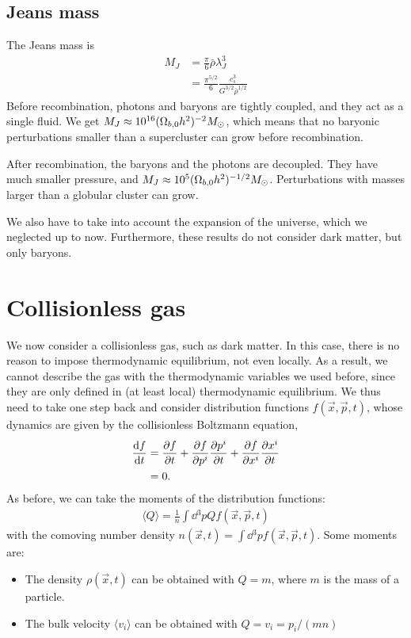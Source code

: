 
\subsection*{Jeans mass}
The Jeans mass is
\begin{align*}
	M_J
	&= \frac{\pi}{6} \bar{\rho} \lambda_J^3\\
	&= \frac{\pi^{5/2}}{6} \frac{c_s^3}{G^{3/2} \bar{\rho}^{1/2}}
\end{align*}
Before recombination, photons and baryons are tightly coupled, and they act as a single fluid. We get $M_J \approx \num{e16} (\Omega_{b,0}h^2)^{-2} M_\odot$, which means that no baryonic perturbations smaller than a supercluster can grow before recombination.

After recombination, the baryons and the photons are decoupled. They have much smaller pressure, and $M_J \approx \num{e5} (\Omega_{b,0}h^2)^{-1/2} M_\odot$. Perturbations with masses larger than a globular cluster can grow.

We also have to take into account the expansion of the universe, which we neglected up to now. Furthermore, these results do not consider dark matter, but only baryons.


\section{Collisionless gas}
\label{sec:collisionless-gas}

We now consider a collisionless gas, such as dark matter. In this case, there is no reason to impose thermodynamic equilibrium, not even locally. As a result, we cannot describe the gas with the thermodynamic variables we used before, since they are only defined in (at least local) thermodynamic equilibrium. We thus need to take one step back and consider distribution functions $f(\vec{x}, \vec{p}, t)$, whose dynamics are given by the collisionless Boltzmann equation,
\begin{align*}
	\dv{f}{t}
	&= \pdv{f}{t} + \pdv{f}{p^i} \pdv{p^i}{t} + \pdv{f}{x^i} \pdv{x^i}{t}\\
	&= 0.
\end{align*}
As before, we can take the moments of the distribution functions:
\begin{align*}
	\langle Q \rangle = \frac{1}{n} \int \dd{^3p} Q f(\vec{x}, \vec{p}, t)
\end{align*}
with the comoving number density $n(\vec{x}, t) = \int \dd{^3p} f(\vec{x}, \vec{p}, t)$. Some moments are:
\begin{itemize}
	\item The density $\rho(\vec{x}, t)$ can be obtained with $Q = m$, where $m$ is the mass of a particle.
	\item The bulk velocity $\langle v_i \rangle$ can be obtained with $Q = v_i = p_i/(m n)$
\end{itemize}

